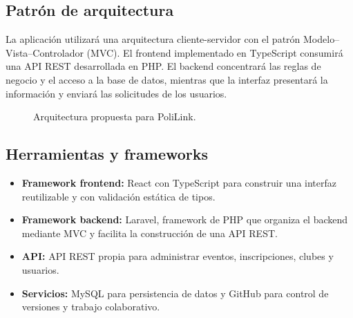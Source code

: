 \documentclass[12pt]{article}
\begin{document}
\subsection{Patrón de arquitectura}

La aplicación utilizará una arquitectura cliente-servidor con el patrón Modelo--Vista--Controlador (MVC). El frontend implementado en TypeScript consumirá una API REST desarrollada en PHP. El backend concentrará las reglas de negocio y el acceso a la base de datos, mientras que la interfaz presentará la información y enviará las solicitudes de los usuarios.

\begin{figure}[h!]
\centering
{}
\caption{Arquitectura propuesta para PoliLink.}
\end{figure}

\subsection{Herramientas y frameworks}

\begin{itemize}
    \item \textbf{Framework frontend:} React con TypeScript para construir una interfaz reutilizable y con validación estática de tipos.
    \item \textbf{Framework backend:} Laravel, framework de PHP que organiza el backend mediante MVC y facilita la construcción de una API REST.
    \item \textbf{API:} API REST propia para administrar eventos, inscripciones, clubes y usuarios.
    \item \textbf{Servicios:} MySQL para persistencia de datos y GitHub para control de versiones y trabajo colaborativo.
\end{itemize}
\end{document}
